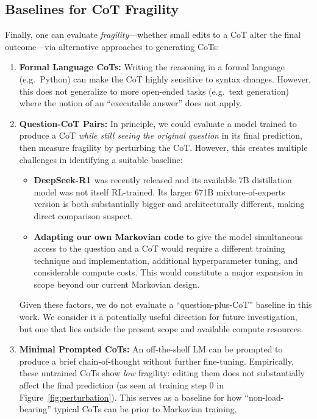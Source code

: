 \documentclass{article}
\theoremstyle{plain}
\theoremstyle{definition}
\theoremstyle{remark}
\begin{document}
\subsection{Baselines for CoT Fragility}
\label{app:baselines_fragility}

Finally, one can evaluate \emph{fragility}---whether small edits to a CoT alter the final outcome---via alternative approaches to generating CoTs:

\begin{enumerate}
    \item \textbf{Formal Language CoTs:}
    Writing the reasoning in a formal language (e.g.\ Python) can make the CoT highly sensitive to syntax changes. However, this does not generalize to more open-ended tasks (e.g.\ text generation) where the notion of an ``executable answer'' does not apply.

\item \textbf{Question-CoT Pairs:}
In principle, we could evaluate a model trained to produce a CoT \emph{while still seeing the original question} in its final prediction, then measure fragility by perturbing the CoT. However, this creates multiple challenges in identifying a suitable baseline:
\begin{itemize}
    \item \textbf{DeepSeek-R1 \citep{deepseekai2025}} was recently released and its available 7B distillation model was not itself RL-trained. Its larger 671B mixture-of-experts version is both substantially bigger and architecturally different, making direct comparison suspect.
    \item \textbf{Adapting our own Markovian code} to give the model simultaneous access to the question and a CoT would require a different training technique and implementation, additional hyperparameter tuning, and considerable compute costs. This would constitute a major expansion in scope beyond our current Markovian design.
\end{itemize}
Given these factors, we do not evaluate a “question-plus-CoT” baseline in this work. We consider it a potentially useful direction for future investigation, but one that lies outside the present scope and available compute resources.

    \item \textbf{Minimal Prompted CoTs:}
    An off-the-shelf LM can be prompted to produce a brief chain-of-thought without further fine-tuning. Empirically, these untrained CoTs show \emph{low} fragility: editing them does not substantially affect the final prediction (as seen at training step 0 in Figure~\ref{fig:perturbation}). This serves as a baseline for how “non-load-bearing” typical CoTs can be prior to Markovian training.
\end{enumerate}
\end{document}
